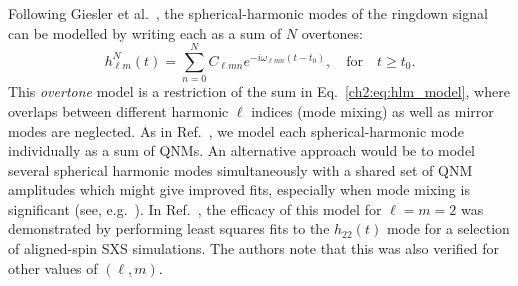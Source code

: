 


Following Giesler et al.~\cite{Giesler:2019uxc}, the spherical-harmonic modes of the ringdown signal can be modelled by writing each as a sum of $N$ overtones:
\begin{equation}\label{GieslerRD}
    h_{\ell m}^N(t) = \sum_{n=0}^N C_{\ell m n} e^{-i\omega_{\ell m n}(t-t_0)}, \quad \textrm{for} \quad t \geq t_0.
\end{equation}
This \emph{overtone} model is a restriction of the sum in Eq.~\ref{ch2:eq:hlm_model}, where overlaps between different harmonic $\ell$ indices (mode mixing) \cite{Berti:2014fga} as well as mirror modes are neglected. 
As in Ref.~\cite{Giesler:2019uxc}, we model each spherical-harmonic mode individually as a sum of QNMs. An alternative approach would be to model several spherical harmonic modes simultaneously with a shared set of QNM amplitudes which might give improved fits, especially when mode mixing is significant (see, e.g.\ \cite{Cook:2020otn}).
In Ref.~\cite{Giesler:2019uxc}, the efficacy of this model for $\ell=m=2$ was demonstrated by performing least squares fits to the $h_{22}(t)$ mode for a selection of aligned-spin SXS simulations. The authors note that this was also verified for other values of $(\ell,m)$.

